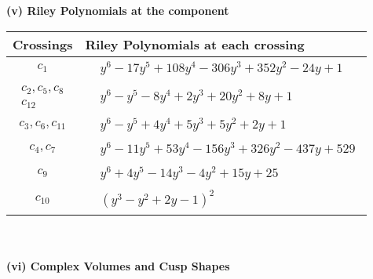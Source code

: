 \documentclass[1p]{elsarticle_modified}
\theoremstyle{definition}
\begin{document}
\newpage\renewcommand{\arraystretch}{1}
\flushleft \textbf{(v) Riley Polynomials at the component}\newline \\
\begin{tabular}{m{50pt}|m{274pt}}
Crossings & \hspace{64pt}Riley Polynomials at each crossing \\
\hline $$\begin{aligned}c_{1}\end{aligned}$$&$\begin{aligned}
&y^6-17 y^5+108 y^4-306 y^3+352 y^2-24 y+1
\end{aligned}$\\
\hline $$\begin{aligned}c_{2},c_{5},c_{8}\\c_{12}\end{aligned}$$&$\begin{aligned}
&y^6- y^5-8 y^4+2 y^3+20 y^2+8 y+1
\end{aligned}$\\
\hline $$\begin{aligned}c_{3},c_{6},c_{11}\end{aligned}$$&$\begin{aligned}
&y^6- y^5+4 y^4+5 y^3+5 y^2+2 y+1
\end{aligned}$\\
\hline $$\begin{aligned}c_{4},c_{7}\end{aligned}$$&$\begin{aligned}
&y^6-11 y^5+53 y^4-156 y^3+326 y^2-437 y+529
\end{aligned}$\\
\hline $$\begin{aligned}c_{9}\end{aligned}$$&$\begin{aligned}
&y^6+4 y^5-14 y^3-4 y^2+15 y+25
\end{aligned}$\\
\hline $$\begin{aligned}c_{10}\end{aligned}$$&$\begin{aligned}
&(y^3- y^2+2 y-1)^2
\end{aligned}$\\
\hline
\end{tabular}\\~\\
\newpage\flushleft \textbf{(vi) Complex Volumes and Cusp Shapes}
\end{document}
